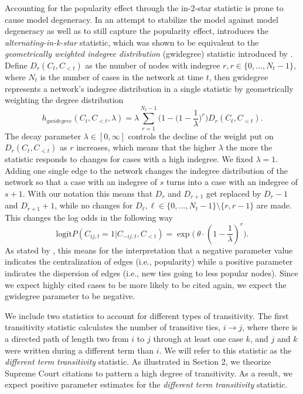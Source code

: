\documentclass[headsepline=true, abstracton]{scrartcl}
\begin{document}
Accounting for the popularity effect through the in-2-star statistic is prone to cause model degeneracy. In an attempt to stabilize the model against model degeneracy as well as to still capture the popularity effect, \citet{SnijdersTomA.B..2006} introduces the \textit{alternating-in-k-star} statistic, which was shown to be equivalent to the \textit{geometrically weighted indegree distribution} (gwidegree) statistic introduced by \citet{hunter2006inference}. Define $D_r(C_t, C_{<t})$ as the number of nodes with indegree $r, r \in \{0, \dots , N_t -1 \}$, where $N_t$ is the number of cases in the network at time $t$, then gwidegree represents a network's indegree distribution in a single statistic by geometrically weighting the degree distribution
\begin{equation}
h_{gwidegree}(C_{t}, C_{<t}, \lambda)= \lambda \sum_{r=1}^{N_t-1}\biggl(1-\bigl(1-\frac{1}{\lambda}\bigr)^r\biggr)D_r(C_t, C_{<t}). 
\label{gwidegree}
\end{equation}
The decay parameter $\lambda \in [0, \infty ]$ controls the decline of the weight put on $D_r(C_t, C_{<t})$ as $r$ increases, which means that the higher $\lambda$ the more the statistic responds to changes for cases with a high indegree. We fixed $\lambda=1$. Adding one single edge to the network changes the indegree distribution of the network so that a case with an indegree of $s$ turns into a case with an indegree of $s + 1$. With our notation this means that $D_r$ and $D_{r+1}$ get replaced by
$D_r -1$ and $D_{r+1} +1$, while no changes for $D_\ell,
 \ell \in \{0, \dots , N_t -1 \} \setminus \{r, r-1\} $ are
made. This changes the log odds in the following way
$$\text{logit} P(C_{ij,t}=1 | C_{-ij,t}, C_{<t}) = \exp \bigl(~\theta \cdot( 1- \frac{1}{\lambda})^r \bigr).$$
As stated by \citet{Levy2016}, this means for the interpretation that a negative parameter value indicates the centralization of edges (i.e., popularity) while a positive parameter indicates the dispersion of edges (i.e., new ties going to less popular nodes). Since we expect highly cited cases to be more likely to be cited again, we expect the gwidegree parameter to be negative.


We include two statistics to account for different types of transitivity.
The first transitivity statistic calculates the number of transitive ties, $i \to j$, where there is a directed path of length two from $i$ to $j$ through at least one case $k$, and $j$ and $k$ were written during a different term than $i$. We will refer to this statistic as the \textit{different term transitivity} statistic. As illustrated in Section 2, we theorize Supreme Court citations to pattern a high degree of transitivity. As a result, we expect positive parameter estimates for the \textit{different term transitivity} statistic. 
\end{document}
